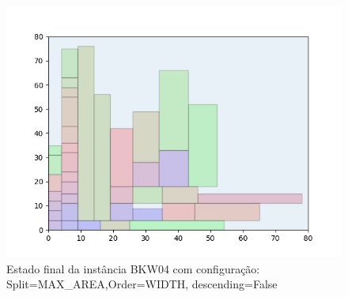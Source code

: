 \begin{figure}[H]
    \centering
    \caption[]{Estado final da instância BKW04 com configuração: Split=MAX_AREA,Order=WIDTH, descending=False}
    \label{fig:bkw04-max_area-width-false}
    \includegraphics[scale=0.5]{output/figures/bkw/bkw04/max_area/width/false/00}
\end{figure}